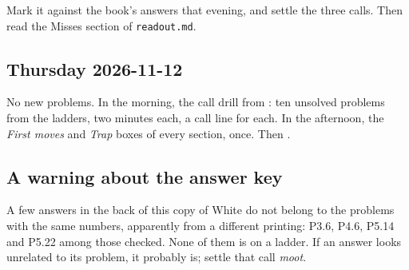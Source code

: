 Mark it against the book's answers that evening, and settle the three calls. Then read the Misses section of \texttt{readout.md}.

\subsection*{Thursday 2026-11-12}

No new problems. In the morning, the call drill from : ten unsolved problems from the ladders, two minutes each, a call line for each. In the afternoon, the \emph{First moves} and \emph{Trap} boxes of every section, once. Then .

\subsection*{A warning about the answer key}

A few answers in the back of this copy of White do not belong to the problems with the same numbers, apparently from a different printing: P3.6, P4.6, P5.14 and P5.22 among those checked. None of them is on a ladder. If an answer looks unrelated to its problem, it probably is; settle that call \emph{moot}.
